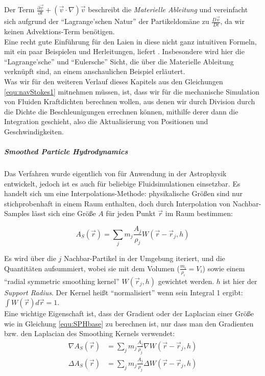 		Der Term 			
		$
				\frac{\partial \vec{v}}{\partial t} 
				+ 
				\left( \vec{v} \cdot \nabla	\right) \vec{v} 
		$
		beschreibt die \emph{Materielle Ableitung} und vereinfacht sich aufgrund der "`Lagrange'schen Natur"'
		der Partikeldomäne zu $\frac{D \vec{v}}{D t}$, da wir keinen Advektions-Term benötigen.\\

		
			
		Eine recht gute Einführung für den Laien in diese nicht ganz intuitiven Formeln, mit ein paar Beispielen
		und Herleitungen, liefert \cite{Steil2007}. Insbesondere wird hier die  
		"`Lagrange'sche"' und "`Eulersche"' Sicht, die über die Materielle Ableitung verknüpft sind,
		an einem anschaulichen Beispiel erläutert.\\
		
		Was wir für den weiteren Verlauf dieses Kapitels aus den Gleichungen \ref{equ:navStokes1} mitnehmen müssen,
		ist, dass wir für die mechanische Simulation von Fluiden Kraftdichten berechnen wollen,
		aus denen wir durch Division durch die Dichte die Beschleunigungen errechnen können,
		mithilfe derer dann die Integration geschieht, also die Aktualisierung von Positionen und Geschwindigkeiten.
			
		
			
				
		\subparagraph{Smoothed Particle Hydrodynamics}
		Das Verfahren wurde eigentlich von \cite{Gingold_Monaghan_1977} für Anwendung in der Astrophysik
		entwickelt, jedoch ist es auch für beliebige Fluidsimulationen einsetzbar.
		Es handelt sich um eine Interpolations-Methode: physikalische Größen sind nur stichprobenhaft
		in einem Raum enthalten, doch durch Interpolation von Nachbar-Samples lässt sich eine Größe $A$
		für jeden Punkt $\vec{r}$ im Raum bestimmen:
		
		\begin{equation} \label{equ:SPHbase}
			A_S(\vec{r}) = \sum_j m_j \frac{A_j}{\rho_j} W(\vec{r}-\vec{r}_j,h)
		\end{equation}
		
		Es wird über die $j$ Nachbar-Partikel in der Umgebung iteriert, und die Quantitäten aufsummiert,
		wobei sie mit dem Volumen ($\frac{m_i}{\rho_i}=V_i$) 
		sowie einem "`radial symmetric smoothing kernel"'  $W(\vec{r}_j,h)$ gewichtet werden.
		$h$ ist hier der \emph{Support Radius}. Der Kernel heißt "`normalisiert"' wenn sein Integral 1 ergibt:
		$\int W(\vec{r}) d \vec{r}=1$.\\
		
		
		Eine wichtige Eigenschaft ist, dass der Gradient oder der Laplacian
		einer Größe wie in Gleichung \ref{equ:SPHbase} zu berechnen ist, nur dass man den Gradienten bzw. den Laplacian
		des Smoothing Kernels verwendet:
		\begin{subequations}\label{equ:navStokes1}
			\begin{align}
			\nabla A_S(\vec{r}) &= \sum_j m_j \frac{A_j}{\rho_j} \nabla W(\vec{r}-\vec{r}_j,h) \\
			\Delta A_S(\vec{r}) &= \sum_j m_j \frac{A_j}{\rho_j} \Delta W(\vec{r}-\vec{r}_j,h)
			\end{align}	
		\end{subequations}
		
